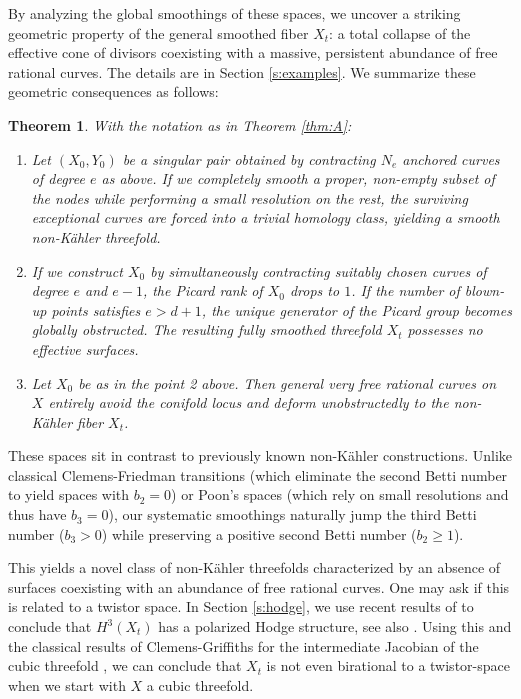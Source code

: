\documentclass[11pt]{article}
\newtheorem{mainthm}{Theorem}
\theoremstyle{definition}
\begin{document}
By analyzing the global smoothings of these spaces, we uncover a striking geometric property of the general smoothed fiber $X_t$: a total collapse of the effective cone of divisors coexisting with a massive, persistent abundance of free rational curves. The details are in Section \ref{s:examples}. We summarize these geometric consequences as follows:

\begin{mainthm} \label{thm:B}
With the notation as in Theorem \ref{thm:A}:
\begin{enumerate}
\item Let $(X_0, Y_0)$ be a singular pair obtained by contracting $N_e$ anchored curves of degree $e$ as above. If we completely smooth a proper, non-empty subset of the nodes while performing a small resolution on the rest, the surviving exceptional curves are forced into a trivial homology class, yielding a smooth non-K\"ahler threefold.
 \item If we construct $X_0$ by simultaneously contracting suitably chosen curves of degree $e$ and $e-1$, the Picard rank of $X_0$ drops to $1$. If the number of blown-up points satisfies $e > d+1$, the unique generator of the Picard group becomes globally obstructed. The resulting fully smoothed threefold $X_t$ possesses no effective surfaces.
\item Let $X_0$ be as in the point 2 above. Then general very free rational curves on $X$ entirely avoid the conifold locus and deform unobstructedly to the non-K\"ahler fiber $X_t$.
\end{enumerate}
\end{mainthm}
These spaces sit in contrast to previously known non-K\"ahler constructions. Unlike classical Clemens-Friedman transitions (which eliminate the second Betti number to yield spaces with $b_2=0$) or Poon's spaces (which rely on small resolutions and thus have $b_3=0$), our systematic smoothings naturally jump the third Betti number ($b_3 > 0$) while preserving a positive second Betti number ($b_2 \ge 1$). 

This yields a novel class of non-K\"ahler threefolds characterized by an absence of surfaces coexisting with an abundance of free rational curves. One may ask if this is related to a twistor space. In Section \ref{s:hodge}, we use recent results of \cite{Che24} to conclude that $H^3(X_t)$ has a polarized Hodge structure, see also \cite{F19,Li24}. Using this and the classical results of Clemens-Griffiths for the intermediate Jacobian of the cubic threefold \cite{CG72}, we can conclude that $X_t$ is not even birational to a twistor-space when we start with $X$ a cubic threefold.
\end{document}
